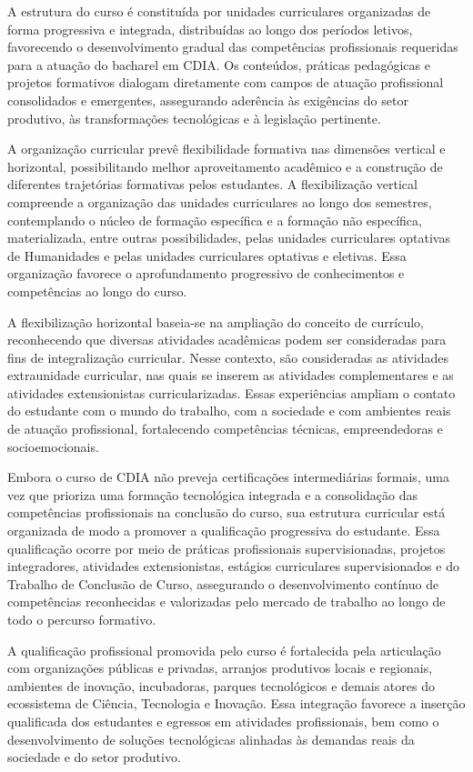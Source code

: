 A estrutura do curso é constituída por unidades curriculares organizadas de forma progressiva e integrada, distribuídas ao longo dos períodos letivos, favorecendo o desenvolvimento gradual das competências profissionais requeridas para a atuação do bacharel em CDIA. Os conteúdos, práticas pedagógicas e projetos formativos dialogam diretamente com campos de atuação profissional consolidados e emergentes, assegurando aderência às exigências do setor produtivo, às transformações tecnológicas e à legislação pertinente.

A organização curricular prevê flexibilidade formativa nas dimensões vertical e horizontal, possibilitando melhor aproveitamento acadêmico e a construção de diferentes trajetórias formativas pelos estudantes. A flexibilização vertical compreende a organização das unidades curriculares ao longo dos semestres, contemplando o núcleo de formação específica e a formação não específica, materializada, entre outras possibilidades, pelas unidades curriculares optativas de Humanidades e pelas unidades curriculares optativas e eletivas. Essa organização favorece o aprofundamento progressivo de conhecimentos e competências ao longo do curso.

A flexibilização horizontal baseia-se na ampliação do conceito de currículo, reconhecendo que diversas atividades acadêmicas podem ser consideradas para fins de integralização curricular. Nesse contexto, são consideradas as atividades extraunidade curricular, nas quais se inserem as atividades complementares e as atividades extensionistas curricularizadas. Essas experiências ampliam o contato do estudante com o mundo do trabalho, com a sociedade e com ambientes reais de atuação profissional, fortalecendo competências técnicas, empreendedoras e socioemocionais.

Embora o curso de CDIA não preveja certificações intermediárias formais, uma vez que prioriza uma formação tecnológica integrada e a consolidação das competências profissionais na conclusão do curso, sua estrutura curricular está organizada de modo a promover a qualificação progressiva do estudante. Essa qualificação ocorre por meio de práticas profissionais supervisionadas, projetos integradores, atividades extensionistas, estágios curriculares supervisionados e do Trabalho de Conclusão de Curso, assegurando o desenvolvimento contínuo de competências reconhecidas e valorizadas pelo mercado de trabalho ao longo de todo o percurso formativo.

A qualificação profissional promovida pelo curso é fortalecida pela articulação com organizações públicas e privadas, arranjos produtivos locais e regionais, ambientes de inovação, incubadoras, parques tecnológicos e demais atores do ecossistema de Ciência, Tecnologia e Inovação. Essa integração favorece a inserção qualificada dos estudantes e egressos em atividades profissionais, bem como o desenvolvimento de soluções tecnológicas alinhadas às demandas reais da sociedade e do setor produtivo.

